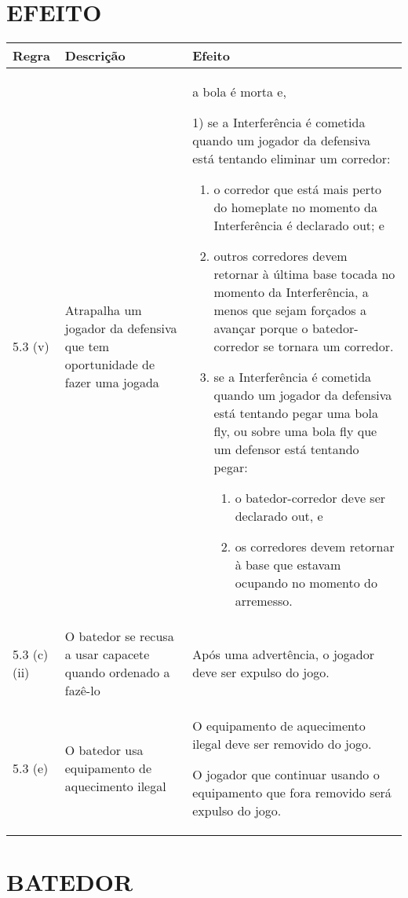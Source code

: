 \section*{EFEITO}
{\footnotesize\begin{tabular}{p{15mm}p{60mm}p{90mm}}
		Regra& Descrição & Efeito\\\hline
		5.3 (v) & Atrapalha um jogador da defensiva que tem oportunidade de fazer uma jogada

		& a bola é morta e,

		1) se a Interferência é cometida quando um jogador da defensiva está tentando eliminar um corredor:
		\begin{enumerate}[label=(\alph*)]
			\item   o corredor que está mais perto do \gls{homeplate} no momento da Interferência é declarado \gls{out}; e
			\item  outros corredores devem retornar à última base tocada no momento da Interferência, a menos que sejam forçados a avançar porque o batedor-corredor se tornara um corredor.
			\item se a Interferência é cometida quando um jogador da defensiva está tentando pegar uma bola \gls{fly}, ou sobre uma bola \gls{fly} que um defensor está tentando pegar:
			\begin{enumerate}[label=(\alph*)]
				\item  o batedor-corredor deve ser declarado \gls{out}, e
				\item  os corredores devem retornar à base que estavam ocupando no momento do arremesso.

			\end{enumerate}
		\end{enumerate}

		\\5.3 (c) (ii) & O batedor se recusa a usar capacete quando ordenado a fazê-lo

		& Após uma advertência, o jogador deve ser expulso do jogo.

		\\ 5.3 (e) & O batedor usa equipamento de aquecimento ilegal

		& O equipamento de aquecimento ilegal deve ser removido do jogo.

		O jogador que continuar usando o equipamento que fora removido será  expulso do jogo.
\end{tabular}}

\section{BATEDOR}
